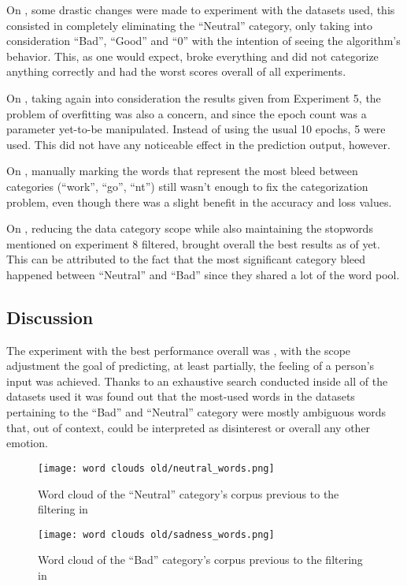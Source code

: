 On , some drastic changes were made to experiment with the datasets used, this consisted in completely eliminating the ``Neutral'' category, only taking into consideration ``Bad'', ``Good'' and ``0'' with the intention of seeing the algorithm's behavior. This, as one would expect, broke everything and did not categorize anything correctly and had the worst scores overall of all experiments. 

On , taking again into consideration the results given from Experiment 5, the problem of overfitting was also a concern, and since the epoch count was a parameter yet-to-be manipulated. Instead of using the usual 10 epochs, 5 were used. This did not have any noticeable effect in the prediction output, however.

On , manually marking the words that represent the most bleed between categories (``work'', ``go'', ``nt'') still wasn't enough to fix the categorization problem, even though there was a slight benefit in the accuracy and loss values.

On , reducing the data category scope while also maintaining the stopwords mentioned on experiment 8 filtered, brought overall the best results as of yet. This can be attributed to the fact that the most significant category bleed happened between ``Neutral'' and ``Bad'' since they shared a lot of the word pool.

\subsection{Discussion}
The experiment with the best performance overall was , with the scope adjustment the goal of predicting, at least partially, the feeling of a person's input was achieved. Thanks to an exhaustive search conducted inside all of the datasets used it was found out that the most-used words in the datasets pertaining to the ``Bad'' and ``Neutral'' category were mostly ambiguous words that, out of context, could be interpreted as disinterest or overall any other emotion.
\begin{figure}[!h]
	\centering
	\texttt{[image: word clouds old/neutral\_words.png]}
	\caption{Word cloud of the ``Neutral'' category's corpus previous to the filtering in }
	\label{fig:neutralwords_pre}
	\vspace{1cm}
	\texttt{[image: word clouds old/sadness\_words.png]}
	\caption{Word cloud of the ``Bad'' category's corpus previous to the filtering in }
	\label{fig:sadnesswords_pre}
\end{figure}

